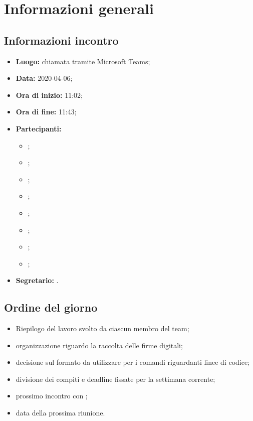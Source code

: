 \section{Informazioni generali}
\subsection{Informazioni incontro}
\begin{itemize}
	\item \textbf{Luogo:} chiamata tramite Microsoft Teams; 
	\item \textbf{Data:} 2020-04-06;
	\item \textbf{Ora di inizio:} 11:02; 
	\item \textbf{Ora di fine:} 11:43; 
	\item \textbf{Partecipanti:}
		\begin{itemize}
			\item \VB; 
			\item \LB; 
			\item \NF; 
			\item \EG; 
			\item \FJ; 
			\item \MP; 
			\item \AS; 
			\item \AZ; 
		\end{itemize}
	\item \textbf{Segretario:} \NF. 
\end{itemize}

\subsection{Ordine del giorno}
\begin{itemize}
	\item Riepilogo del lavoro svolto da ciascun membro del team;
	\item organizzazione riguardo la raccolta delle firme digitali;
	\item decisione sul formato da utilizzare per i comandi riguardanti linee di codice;
	\item divisione dei compiti e deadline fissate per la settimana corrente;
	\item prossimo incontro con \Proponente{};
	\item data della prossima riunione.
\end{itemize}
